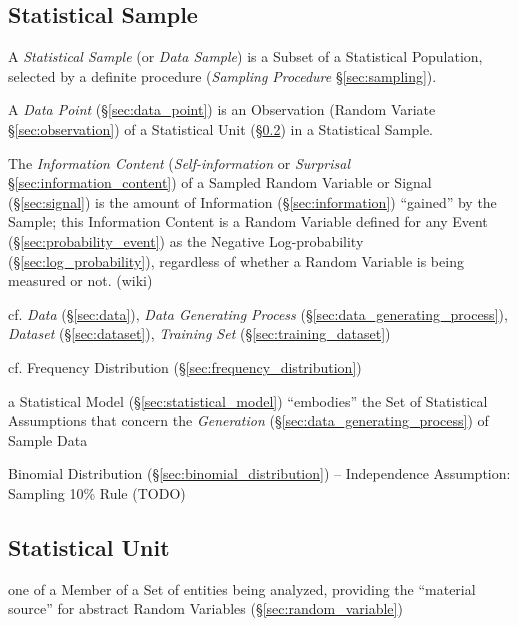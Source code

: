 \subsection{Statistical Sample}\label{sec:sample}

A \emph{Statistical Sample} (or \emph{Data Sample}) is a Subset of a Statistical
Population, selected by a definite procedure (\emph{Sampling Procedure}
\S\ref{sec:sampling}).

\fist A \emph{Data Point} (\S\ref{sec:data_point}) is an Observation (Random
Variate \S\ref{sec:observation}) of a Statistical Unit
(\S\ref{sec:statistical_unit}) in a Statistical Sample.

The \emph{Information Content} (\emph{Self-information} or \emph{Surprisal}
\S\ref{sec:information_content}) of a Sampled Random Variable or Signal
(\S\ref{sec:signal}) is the amount of Information (\S\ref{sec:information})
``gained'' by the Sample; this Information Content is a Random Variable defined
for any Event (\S\ref{sec:probability_event}) as the Negative Log-probability
(\S\ref{sec:log_probability}), regardless of whether a Random Variable is being
measured or not. (wiki)

\fist cf. \emph{Data} (\S\ref{sec:data}), \emph{Data Generating Process}
(\S\ref{sec:data_generating_process}), \emph{Dataset} (\S\ref{sec:dataset}),
\emph{Training Set} (\S\ref{sec:training_dataset})

\fist cf. Frequency Distribution (\S\ref{sec:frequency_distribution})

\fist a Statistical Model (\S\ref{sec:statistical_model}) ``embodies'' the Set
of Statistical Assumptions that concern the \emph{Generation}
(\S\ref{sec:data_generating_process}) of Sample Data

Binomial Distribution (\S\ref{sec:binomial_distribution}) -- Independence
Assumption: Sampling 10\% Rule (TODO)



\subsection{Statistical Unit}\label{sec:statistical_unit}

one of a Member of a Set of entities being analyzed, providing the ``material
source'' for abstract Random Variables (\S\ref{sec:random_variable})

